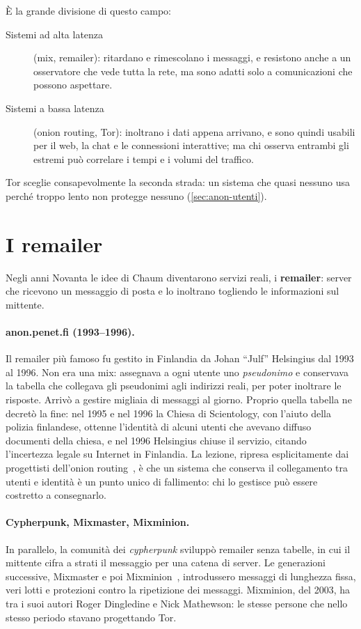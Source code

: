È la grande divisione di questo campo:
\begin{description}
  \item[Sistemi ad alta latenza] (mix, remailer): ritardano e rimescolano i messaggi, e resistono anche a un osservatore che vede tutta la rete, ma sono adatti solo a comunicazioni che possono aspettare.
  \item[Sistemi a bassa latenza] (onion routing, Tor): inoltrano i dati appena arrivano, e sono quindi usabili per il web, la chat e le connessioni interattive; ma chi osserva entrambi gli estremi può correlare i tempi e i volumi del traffico.
\end{description}
Tor sceglie consapevolmente la seconda strada: un sistema che quasi nessuno usa perché troppo lento non protegge nessuno (\cref{sec:anon-utenti}).

\section{I remailer}\label{sec:radici-remailer}

Negli anni Novanta le idee di Chaum diventarono servizi reali, i \textbf{remailer}: server che ricevono un messaggio di posta e lo inoltrano togliendo le informazioni sul mittente.

\paragraph{anon.penet.fi (1993--1996).} Il remailer più famoso fu gestito in Finlandia da Johan \enquote{Julf} Helsingius dal 1993 al 1996. Non era una mix: assegnava a ogni utente uno \emph{pseudonimo} e conservava la tabella che collegava gli pseudonimi agli indirizzi reali, per poter inoltrare le risposte. Arrivò a gestire migliaia di messaggi al giorno. Proprio quella tabella ne decretò la fine: nel 1995 e nel 1996 la Chiesa di Scientology, con l'aiuto della polizia finlandese, ottenne l'identità di alcuni utenti che avevano diffuso documenti della chiesa, e nel 1996 Helsingius chiuse il servizio, citando l'incertezza legale su Internet in Finlandia. La lezione, ripresa esplicitamente dai progettisti dell'onion routing~\cite{syverson2011peel}, è che un sistema che conserva il collegamento tra utenti e identità è un punto unico di fallimento: chi lo gestisce può essere costretto a consegnarlo.

\paragraph{Cypherpunk, Mixmaster, Mixminion.} In parallelo, la comunità dei \emph{cypherpunk} sviluppò remailer senza tabelle, in cui il mittente cifra a strati il messaggio per una catena di server. Le generazioni successive, Mixmaster e poi Mixminion~\cite{danezis2003mixminion}, introdussero messaggi di lunghezza fissa, veri lotti e protezioni contro la ripetizione dei messaggi. Mixminion, del 2003, ha tra i suoi autori Roger Dingledine e Nick Mathewson: le stesse persone che nello stesso periodo stavano progettando Tor.

